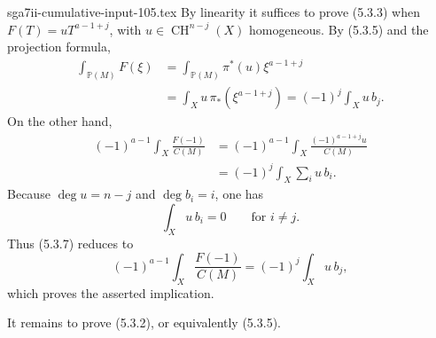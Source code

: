\begin{filecontents*}{sga7ii-cumulative-input-105.tex}
By linearity it suffices to prove (5.3.3) when
$F(T)=uT^{a-1+j}$, with $u\in\operatorname{CH}^{n-j}(X)$
homogeneous.  By (5.3.5) and the projection formula,
\begin{equation}\tag{5.3.6}
\begin{aligned}
\int_{\mathbb P(M)}F(\xi)
&=\int_{\mathbb P(M)}\pi^*(u)\xi^{a-1+j}\\
&=\int_Xu\,\pi_*(\xi^{a-1+j})
=(-1)^j\int_Xu\,b_j.
\end{aligned}
\end{equation}
On the other hand,
\begin{equation}\tag{5.3.7}
\begin{aligned}
(-1)^{a-1}\int_X\frac{F(-1)}{C(M)}
&=(-1)^{a-1}\int_X
  \frac{(-1)^{a-1+j}u}{C(M)}\\
&=(-1)^j\int_X\sum_i u\,b_i.
\end{aligned}
\end{equation}
Because $\deg u=n-j$ and $\deg b_i=i$, one has
\[
\int_Xu\,b_i=0\qquad\text{for }i\ne j.
\]
Thus (5.3.7) reduces to
\begin{equation}\tag{5.3.8}
(-1)^{a-1}\int_X\frac{F(-1)}{C(M)}
=(-1)^j\int_Xu\,b_j,
\end{equation}
which proves the asserted implication.

It remains to prove (5.3.2), or equivalently (5.3.5).

\end{filecontents*}
